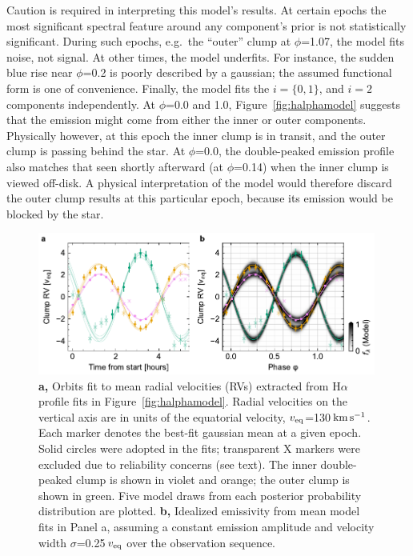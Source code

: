 \documentclass[11pt,twocolumn,tighten,linenumbers]{aastex7}
\newcommand{\kms}{\ensuremath{\rm km\,s^{-1}}}
\begin{document}
Caution is required in interpreting this model's results.  At certain
epochs the most significant spectral feature around any component's
prior is not statistically significant.  During such epochs, e.g.~the
``outer'' clump at $\phi$=1.07, the model fits noise, not signal.  At
other times, the model underfits.  For instance, the sudden blue rise
near $\phi$=0.2 is poorly described by a gaussian; the assumed
functional form is one of convenience.  Finally, the model fits the
$i=\{ 0, 1 \}$, and $i=2$ components independently.  At $\phi$=0.0 and
1.0, Figure~\ref{fig:halphamodel} suggests that the emission might
come from either the inner or outer components.  Physically however,
at this epoch the inner clump is in transit, and the outer clump is
passing behind the star.  At $\phi$=0.0, the double-peaked emission
profile also matches that seen shortly afterward (at $\phi$=0.14) when
the inner clump is viewed off-disk.  A physical interpretation of the
model would therefore discard the outer clump results at this
particular epoch, because its emission would be blocked by the star.

\begin{figure}[!t]
  \centering
  \includegraphics[width=0.99\textwidth]{figures/sf7.pdf}
  \caption{{\bf a,} Orbits fit to mean radial velocities (RVs)
  extracted from H$\alpha$ profile fits in
  Figure~\ref{fig:halphamodel}.  Radial velocities on the vertical
  axis are in units of the equatorial velocity, $v_{\rm
  eq}$=130\,\kms.  Each marker denotes the best-fit gaussian mean at a
  given epoch.  Solid circles were adopted in the fits; transparent X
  markers were excluded due to reliability concerns (see text).  The
  inner double-peaked clump is shown in violet and orange; the outer
  clump is shown in green.  Five model draws from each posterior
  probability distribution are plotted.  {\bf b,} Idealized emissivity
  from mean model fits in Panel a, assuming a constant emission
  amplitude and velocity width $\sigma$=0.25\,$v_{\rm eq}$ over the
  observation sequence.}
  \label{fig:orbits}
\end{figure}
\end{document}
